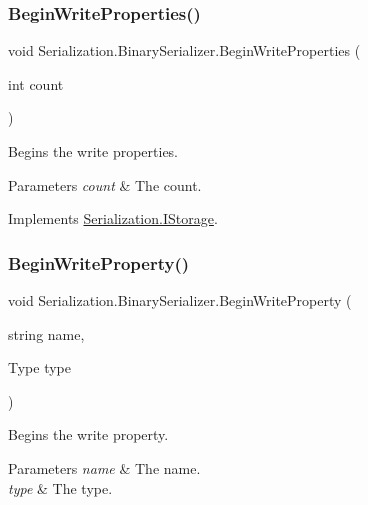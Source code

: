 \subsubsection{\texorpdfstring{Begin\+Write\+Properties()}{BeginWriteProperties()}}
{\footnotesize\ttfamily void Serialization.\+Binary\+Serializer.\+Begin\+Write\+Properties (\begin{DoxyParamCaption}\item[{int}]{count }\end{DoxyParamCaption})\hspace{0.3cm}{\ttfamily [inline]}}



Begins the write properties. 


\begin{DoxyParams}{Parameters}
{\em count} & The count.\\
\hline
\end{DoxyParams}


Implements \hyperlink{interface_serialization_1_1_i_storage_a4aa8e9eeb65572cabfd1163fd424f447}{Serialization.\+I\+Storage}.

\mbox{\label{class_serialization_1_1_binary_serializer_adbfae0ca57e2c848c4efa0ae23b25e62}} 
\subsubsection{\texorpdfstring{Begin\+Write\+Property()}{BeginWriteProperty()}}
{\footnotesize\ttfamily void Serialization.\+Binary\+Serializer.\+Begin\+Write\+Property (\begin{DoxyParamCaption}\item[{string}]{name,  }\item[{Type}]{type }\end{DoxyParamCaption})\hspace{0.3cm}{\ttfamily [inline]}}



Begins the write property. 


\begin{DoxyParams}{Parameters}
{\em name} & The name.\\
\hline
{\em type} & The type.\\
\hline
\end{DoxyParams}



